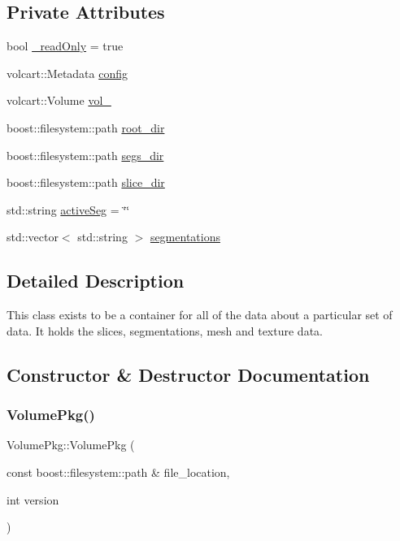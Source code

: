 \subsection*{Private Attributes}
\begin{DoxyCompactItemize}
\item 
bool \hyperlink{classVolumePkg_a032ffe2acb8dcb5efe26312a3730aa85}{\+\_\+read\+Only} = true
\item 
volcart\+::\+Metadata \hyperlink{classVolumePkg_a01960fbb8a1dec9da54f5e2468baeb0e}{config}
\item 
volcart\+::\+Volume \hyperlink{classVolumePkg_a0df52f6f476a106802da0bfc1b2d5b23}{vol\+\_\+}
\item 
boost\+::filesystem\+::path \hyperlink{classVolumePkg_a564d5b92303bb807979d0ab09afa8eec}{root\+\_\+dir}
\item 
boost\+::filesystem\+::path \hyperlink{classVolumePkg_a7093bd35d5d8d7ef0b50a1e182bfbf56}{segs\+\_\+dir}
\item 
boost\+::filesystem\+::path \hyperlink{classVolumePkg_a277efff0ba8ce1043c83d15eaf5c5427}{slice\+\_\+dir}
\item 
std\+::string \hyperlink{classVolumePkg_a192921e57935c16e2e92c2ede350e08a}{active\+Seg} = \char`\"{}\char`\"{}
\item 
std\+::vector$<$ std\+::string $>$ \hyperlink{classVolumePkg_a2c66b1685cb4b0be679097a61acb822b}{segmentations}
\end{DoxyCompactItemize}


\subsection{Detailed Description}
This class exists to be a container for all of the data about a particular set of data. It holds the slices, segmentations, mesh and texture data. 

\subsection{Constructor \& Destructor Documentation}
\hypertarget{classVolumePkg_a744e1956dc2a4110b67cc088b2a0a871}{}\label{classVolumePkg_a744e1956dc2a4110b67cc088b2a0a871} 
\subsubsection{\texorpdfstring{Volume\+Pkg()}{VolumePkg()}\hspace{0.1cm}{\footnotesize\ttfamily [1/2]}}
{\footnotesize\ttfamily Volume\+Pkg\+::\+Volume\+Pkg (\begin{DoxyParamCaption}\item[{const boost\+::filesystem\+::path \&}]{file\+\_\+location,  }\item[{int}]{version }\end{DoxyParamCaption})}

